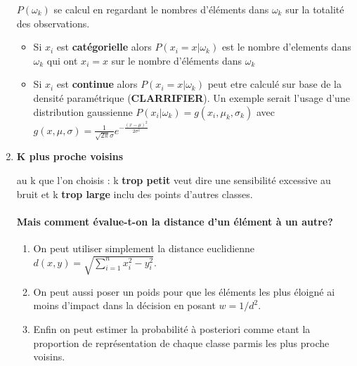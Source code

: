 \documentclass[a4paper, 11pt, onecolumn]{article}
\begin{document}
\begin{enumerate}
$P(\omega_k)$ se calcul en regardant le nombres d'éléments dans $\omega_k$ sur la totalité des observations.
\begin{itemize}
  \item Si $x_i$ est \textbf{catégorielle} alors $P(x_i=x|\omega_k)$ est le nombre d'elements dans $\omega_k$ qui ont $x_i=x$ sur le nombre d'éléments dans $\omega_k$
  \item Si $x_i$ est \textbf{continue} alors $P(x_i=x|\omega_k)$ peut etre calculé sur base de la densité paramétrique (\textbf{CLARRIFIER}). Un exemple serait l'usage d'une distribution gaussienne $P(x_i|\omega_k)=g(x_i, \mu_k, \sigma_k)$ avec $g(x,\mu,\sigma)=\frac{1}{\sqrt{2\pi}\sigma}e^{-\frac{(x-\mu)^2}{2\sigma^2}}$
\end{itemize}

\item \textbf{K plus proche voisins}


  \danger au k que l'on choisis : k \textbf{trop petit} veut dire une sensibilité excessive au bruit et k \textbf{trop large} inclu des points d'autres classes.

  \paragraph{Mais comment évalue-t-on la distance d'un élément à un autre?}
  \begin{enumerate}
    \item {On peut utiliser simplement la distance euclidienne $d(x,y)=\sqrt{\sum_{i=1}^nx_i^2-y_i^2}$.}
    \item {On peut aussi poser un poids pour que les éléments les plus éloigné ai moins d'impact dans la décision en posant $w = 1/d^2$.}
    \item {Enfin on peut estimer la probabilité à posteriori comme etant la proportion de représentation de chaque classe parmis les plus proche voisins.}
  \end{enumerate}


\end{enumerate}
\end{document}
